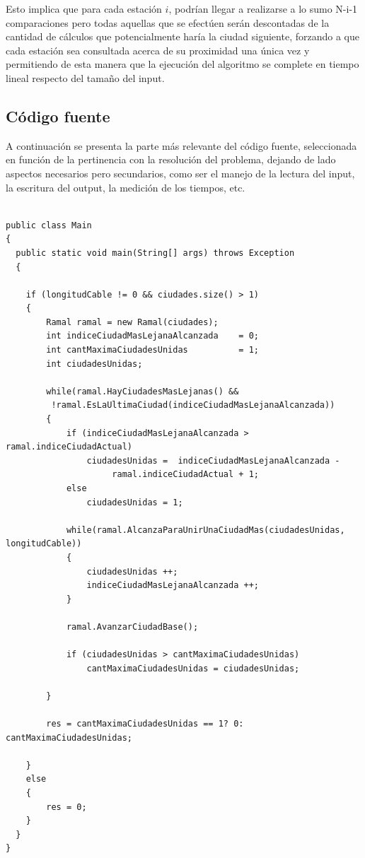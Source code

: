 Esto implica que para cada estación $i$, podrían llegar a realizarse a lo sumo N-i-1 comparaciones pero todas aquellas que se efectúen serán descontadas de la cantidad de cálculos que potencialmente haría la ciudad siguiente, forzando a que cada estación sea consultada acerca de su proximidad una única vez y permitiendo de esta manera que la ejecución del algoritmo se complete en tiempo lineal respecto del tamaño del input.\\ 

\newpage
\subsection{C\'odigo fuente}

A continuación se presenta la parte más relevante del código fuente, seleccionada en función de la pertinencia con la resolución del problema, dejando de lado aspectos necesarios pero secundarios, como ser el manejo de la lectura del input, la escritura del output, 
la medición de los tiempos, etc.

\begin{verbatim}

public class Main 
{
  public static void main(String[] args) throws Exception 
  {
 
	if (longitudCable != 0 && ciudades.size() > 1)
	{
	    Ramal ramal = new Ramal(ciudades);
	    int indiceCiudadMasLejanaAlcanzada    = 0;  
	    int cantMaximaCiudadesUnidas          = 1;   
	    int ciudadesUnidas;

	    while(ramal.HayCiudadesMasLejanas() &&
		 !ramal.EsLaUltimaCiudad(indiceCiudadMasLejanaAlcanzada)) 
	    {
	        if (indiceCiudadMasLejanaAlcanzada > ramal.indiceCiudadActual)
	            ciudadesUnidas =  indiceCiudadMasLejanaAlcanzada -
					 ramal.indiceCiudadActual + 1;
	        else
	            ciudadesUnidas = 1;                 

	        while(ramal.AlcanzaParaUnirUnaCiudadMas(ciudadesUnidas, longitudCable)) 
	        {
	            ciudadesUnidas ++;
	            indiceCiudadMasLejanaAlcanzada ++;
	        }
	                                
	        ramal.AvanzarCiudadBase();
	        
	        if (ciudadesUnidas > cantMaximaCiudadesUnidas)
	            cantMaximaCiudadesUnidas = ciudadesUnidas;
	        
	    }
	      
	    res = cantMaximaCiudadesUnidas == 1? 0: cantMaximaCiudadesUnidas;

	}
	else
	{
	    res = 0;
	}
  } 
}

\end{verbatim}

